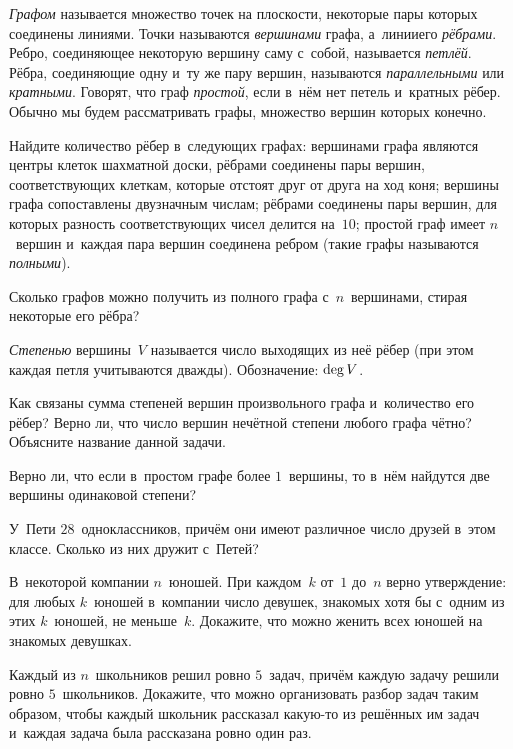 \documentclass[a4paper,12pt]{article}
\begin{document}


\emph{Графом} называется множество точек на плоскости, некоторые пары которых соединены линиями. Точки называются \emph{вершинами} графа, а~линии\т его \emph{рёбрами}. Ребро, соединяющее некоторую вершину саму с~собой, называется \emph{петлёй}. Рёбра, соединяющие одну и~ту же пару вершин, называются \emph{параллельными} или \emph{кратными}. Говорят, что граф \emph{простой}, если в~нём нет петель и~кратных рёбер.\\
Обычно мы будем рассматривать графы, множество вершин которых конечно.

Найдите количество рёбер в~следующих графах:
вершинами графа являются центры клеток шахматной доски, рёбрами соединены пары вершин, соответствующих клеткам, которые отстоят друг от друга на ход коня;
вершины графа сопоставлены двузначным числам; рёбрами соединены пары вершин, для которых разность соответствующих чисел делится на~$10$;
простой граф имеет $n$~вершин и~каждая пара вершин соединена ребром (такие графы называются  \emph{полными}).

Сколько графов можно получить из полного графа с~$n$~вершинами, стирая некоторые его рёбра?

\emph{Степенью} вершины~$V$ называется число выходящих из неё рёбер (при этом каждая петля учитываются дважды). Обозначение: ${\rm deg}\,V$.

Как связаны сумма степеней вершин произвольного графа и~количество его рёбер?
Верно ли, что число вершин нечётной степени любого графа чётно?
Объясните название данной задачи.

Верно ли, что если в~простом графе более $1$~вершины, то в~нём найдутся две вершины одинаковой степени?

У~Пети $28$~одноклассников, причём они имеют различное число друзей в~этом классе. Сколько из них дружит с~Петей?

В~некоторой компании $n$~юношей. При каждом~$k$ от~$1$ до~$n$ верно утверждение: для любых $k$~юношей в~компании число девушек, знакомых хотя бы с~одним из этих $k$~юношей, не меньше~$k$. Докажите, что можно женить всех юношей на знакомых девушках.

Каждый из $n$~школьников решил ровно $5$~задач, причём каждую задачу решили ровно $5$~школьников. Докажите, что можно организовать разбор задач таким образом, чтобы каждый школьник рассказал какую-то из решённых им задач и~каждая задача была рассказана ровно один раз.
\end{document}
